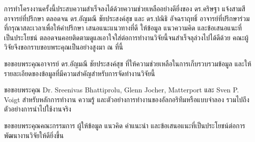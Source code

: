\documentclass[12pt,oneside,openright,a4paper]{cpe-thai-project}
\begin{document}

\preface
การทำโครงงานครั้งนี้ประสบความสำเร็จลงได้ด้วยความช่วยเหลืออย่างดียิ่งของ ดร.คริษฐา แจ้งสามสี อาจารย์ที่ปรึกษา ตลอดจน ดร.อัญมณี ชัยประสงค์สุข และ ดร.ปณิธิ อัจฉราฤทธิ์ อาจารย์ที่ปรึกษาร่วม ที่กรุณาสละเวลาเพื่อให้คำปรึกษา เสนอแนะแนวทางที่ดี ให้ข้อมูล แนวความคิด และข้อเสนอแนะที่เป็นประโยชน์ ตลอดจนคอยติดตามดูแลเอาใจใส่ต่อการทำงานวิจัยนี้จนสำเร็จลุล่วงไปได้ดีด้วย คณะผู้วิจัยจึงขอกราบขอบพระคุณเป็นอย่างสูงมา ณ ที่นี้ 

ขอขอบพระคุณอาจารย์ ดร.อัญมณี ชัยประสงค์สุข ที่ให้ความช่วยเหลือในการเก็บรวบรวมข้อมูล และให้รายละเอียดของข้อมูลที่มีความสำคัญสำหรับการจัดทำงานวิจัยนี้ 

ขอขอบพระคุณ Dr. Sreenivas Bhattiprolu, Glenn Jocher, Matterport และ Sven P. Voigt สำหรับหลักการทำงาน ความรู้ และตัวอย่างการทำงานของอัลกอริทึมหรือแบบจำลอง รวมไปถึงตัวอย่างการนำไปใช้งานจริง

ขอขอบพระคุณคณะกรรมการ ผู้ให้ข้อมูล แนวคิด คำแนะนำ และข้อเสนอแนะที่เป็นประโยชน์ต่อการพัฒนางานวิจัยให้ดียิ่งขึ้น \\

\tableofcontents                    
\listoftables
\listoffigures                      
\end{document}
